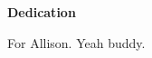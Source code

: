 \newpage
{}
\begin{center}
\textbf{Dedication}

\vspace{0.2in}
For Allison. Yeah buddy.
\end{center}
